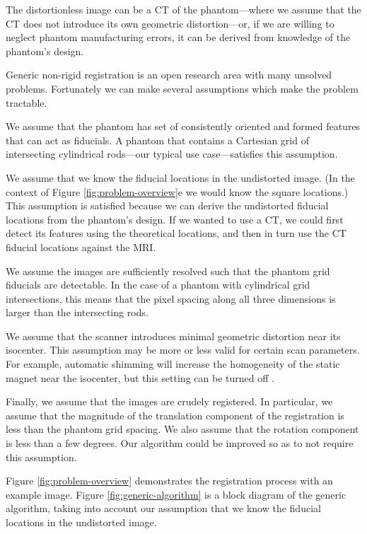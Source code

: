 \documentclass[12pt]{article}
\begin{document}
The distortionless image can be a CT of the phantom---where we assume that the CT does not introduce its own geometric distortion---or, if we are willing to neglect phantom manufacturing errors, it can be derived from knowledge of the phantom's design.

Generic non-rigid registration is an open research area with many unsolved problems.  Fortunately we can make several assumptions which make the problem tractable.

We assume that the phantom has set of consistently oriented and formed features that can act as fiducials.  A phantom that contains a Cartesian grid of intersecting cylindrical rods---our typical use case---satisfies this assumption.

We assume that we know the fiducial locations in the undistorted image.  (In the context of Figure \ref{fig:problem-overview}e we would know the square locations.)  This assumption is satisfied because we can derive the undistorted fiducial locations from the phantom's design.  If we wanted to use a CT, we could first detect its features using the theoretical locations, and then in turn use the CT fiducial locations against the MRI.

We assume the images are sufficiently resolved such that the phantom grid fiducials are detectable.  In the case of a phantom with cylindrical grid intersections, this means that the pixel spacing along all three dimensions is larger than the intersecting rods.

We assume that the scanner introduces minimal geometric distortion near its isocenter.  This assumption may be more or less valid for certain scan parameters.  For example, automatic shimming will increase the homogeneity of the static magnet near the isocenter, but this setting can be turned off \cite{baldwin2007}.

Finally, we assume that the images are crudely registered.  In particular, we assume that the magnitude of the translation component of the registration is less than the phantom grid spacing.  We also assume that the rotation component is less than a few degrees.  Our algorithm could be improved so as to not require this assumption.

Figure \ref{fig:problem-overview} demonstrates the registration process with an example image.  Figure \ref{fig:generic-algorithm} is a block diagram of the generic algorithm, taking into account our assumption that we know the fiducial locations in the undistorted image.
\end{document}
